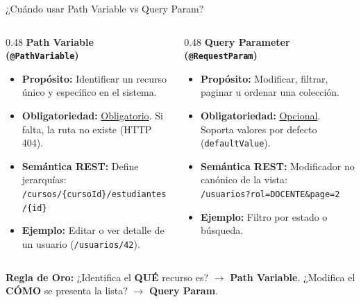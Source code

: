 \documentclass[aspectratio=169]{beamer}
\begin{document}
\begin{frame}{¿Cu\'ando usar Path Variable vs Query Param?}
\begin{columns}[c]
\begin{column}{0.48\textwidth}
  \textbf{Path Variable (\texttt{@PathVariable})}
  \begin{itemize}
    \item \textbf{Prop\'osito:} Identificar un recurso \'unico y espec\'ifico en el sistema.
    \item \textbf{Obligatoriedad:} \underline{Obligatorio}. Si falta, la ruta no existe (HTTP 404).
    \item \textbf{Sem\'antica REST:} Define jerarqu\'ias:\\
      \texttt{/cursos/\{cursoId\}/estudiantes/\{id\}}
    \item \textbf{Ejemplo:} Editar o ver detalle de un usuario (\texttt{/usuarios/42}).
  \end{itemize}
\end{column}
\begin{column}{0.48\textwidth}
  \textbf{Query Parameter (\texttt{@RequestParam})}
  \begin{itemize}
    \item \textbf{Prop\'osito:} Modificar, filtrar, paginar u ordenar una colecci\'on.
    \item \textbf{Obligatoriedad:} \underline{Opcional}. Soporta valores por defecto (\texttt{defaultValue}).
    \item \textbf{Sem\'antica REST:} Modificador no can\'onico de la vista:\\
      \texttt{/usuarios?rol=DOCENTE\&page=2}
    \item \textbf{Ejemplo:} Filtro por estado o b\'usqueda.
  \end{itemize}
\end{column}
\end{columns}
\vspace{6pt}
\centering
\textbf{Regla de Oro:} ¿Identifica el \textbf{QU\'E} recurso es? $\rightarrow$ \textbf{Path Variable}. ¿Modifica el \textbf{C\'OMO} se presenta la lista? $\rightarrow$ \textbf{Query Param}.
\end{frame}

\end{document}

